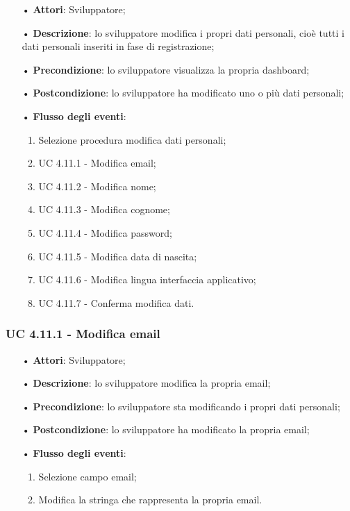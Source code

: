 \begin{itemize}
	\item[•]\textbf{Attori}: Sviluppatore;
	\item[•]\textbf{Descrizione}: lo sviluppatore modifica i propri dati personali, cioè tutti i dati personali inseriti in fase di registrazione;
	\item[•]\textbf{Precondizione}: lo sviluppatore visualizza la propria dashboard;
	\item[•]\textbf{Postcondizione}: lo sviluppatore ha modificato uno o più dati personali; 
	\item[•]\textbf{Flusso degli eventi}: 
	\begin{enumerate}
		\item Selezione procedura modifica dati personali;
		\item UC 4.11.1 - Modifica email; 
		\item UC 4.11.2 - Modifica nome;
		\item UC 4.11.3 - Modifica cognome;
		\item UC 4.11.4 - Modifica password;
		\item UC 4.11.5 - Modifica data di nascita;
		\item UC 4.11.6 - Modifica lingua interfaccia applicativo;
		\item UC 4.11.7 - Conferma modifica dati.
	\end{enumerate}
\end{itemize}
\subsubsection{UC 4.11.1 - Modifica email}
\begin{itemize}
	\item[•]\textbf{Attori}: Sviluppatore;
	\item[•]\textbf{Descrizione}: lo sviluppatore modifica la propria email;
	\item[•]\textbf{Precondizione}: lo sviluppatore sta modificando i propri dati personali;
	\item[•]\textbf{Postcondizione}: lo sviluppatore ha modificato la propria email; 
	\item[•]\textbf{Flusso degli eventi}: 
	\begin{enumerate}
		\item Selezione campo email;
		\item Modifica la stringa che rappresenta la propria email.
	\end{enumerate}
\end{itemize}
